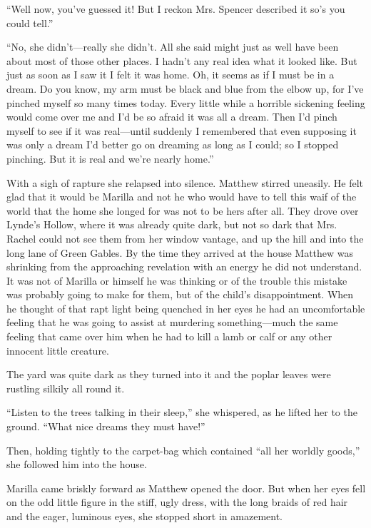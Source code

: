 \documentclass[a4paper]{article}
\begin{document}
{\rmfamily``Well now, you've guessed it! But I reckon Mrs. Spencer described it so's you could tell.''

``No, she didn't---really she didn't. All she said might just as well have been about most of those other places. I hadn't any real idea what it looked like. But just as soon as I saw it I felt it was home. Oh, it seems as if I must be in a dream. Do you know, my arm must be black and blue from the elbow up, for I've pinched myself so many times today. Every little while a horrible sickening feeling would come over me and I'd be so afraid it was all a dream. Then I'd pinch myself to see if it was real---until suddenly I remembered that even supposing it was only a dream I'd better go on dreaming as long as I could; so I stopped pinching. But it is real and we're nearly home.''}

With a sigh of rapture she relapsed into silence. Matthew stirred uneasily. He felt glad that it would be Marilla and not he who would have to tell this waif of the world that the home she longed for was not to be hers after all. They drove over Lynde's Hollow, where it was already quite dark, but not so dark that Mrs. Rachel could not see them from her window vantage, and up the hill and into the long lane of Green Gables. By the time they arrived at the house Matthew was shrinking from the approaching revelation with an energy he did not understand. It was not of Marilla or himself he was thinking or of the trouble this mistake was probably going to make for them, but of the child's disappointment. When he thought of that rapt light being quenched in her eyes he had an uncomfortable feeling that he was going to assist at murdering something---much the same feeling that came over him when he had to kill a lamb or calf or any other innocent little creature.

The yard was quite dark as they turned into it and the poplar leaves were rustling silkily all round it.

{\ttfamily``Listen to the trees talking in their sleep,'' she whispered, as he lifted her to the ground. ``What nice dreams they must have!''

Then, holding tightly to the carpet-bag which contained ``all her worldly goods,'' she followed him into the house.}

Marilla came briskly forward as Matthew opened the door. But when her eyes fell on the odd little figure in the stiff, ugly dress, with the long braids of red hair and the eager, luminous eyes, she stopped short in amazement.
\end{document}
